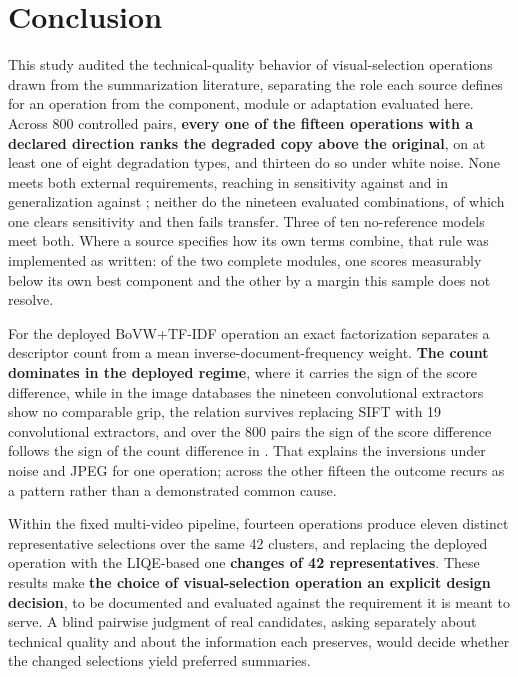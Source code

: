 \section{Conclusion}\label{sec:conclusion}

This study audited the technical-quality behavior of visual-selection operations drawn
from the summarization literature, separating the role each source defines for an operation
from the component, module or adaptation evaluated here. Across 800 controlled pairs, \textbf{every one of the fifteen operations with a declared direction ranks the degraded
copy above the original}, on at least one of eight degradation types, and thirteen do so
under white noise. None meets both external requirements, reaching \pisoMelhorSens{} in
sensitivity against \pisoLimSens{} and \pisoMelhorGen{} in generalization against
\pisoLimGen{}; neither do the nineteen evaluated combinations, of which one clears
sensitivity and then fails transfer. Three of ten no-reference models meet both. Where a source specifies how its own terms
combine, that rule was implemented as written: of the two complete modules, one scores
measurably below its own best component and the other by a margin this sample does not
resolve.

For the deployed BoVW+TF-IDF operation an exact factorization separates a descriptor count
from a mean inverse-document-frequency weight. \textbf{The count dominates in the deployed regime}, where it carries the sign of the score difference, while in the image databases the nineteen convolutional extractors show no comparable grip, the relation survives replacing
SIFT with 19 convolutional extractors, and over the 800 pairs the sign of the score
difference follows the sign of the count difference in \mecConcordam{}. That explains the inversions under noise and JPEG for one operation; across the other
fifteen the outcome recurs as a pattern rather than a demonstrated common cause.

Within the fixed multi-video pipeline, fourteen operations produce eleven distinct
representative selections over the same 42 clusters, and replacing the deployed operation with the LIQE-based one \textbf{changes \casCompleta{} of
42 representatives}. These results make \textbf{the choice of visual-selection operation an explicit design
decision}, to be documented and evaluated against the requirement it is meant to serve. A blind pairwise judgment of real candidates, asking separately about technical quality
and about the information each preserves, would decide whether the changed selections
yield preferred summaries.

